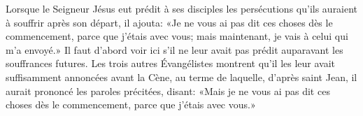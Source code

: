 Lorsque le Seigneur Jésus eut prédit à ses disciples
	les persécutions qu’ils auraient à souffrir après son départ,
	il ajouta: «Je ne vous ai pas dit ces choses dès le commencement,
	parce que j’étais avec vous;
	mais maintenant, je vais à celui qui m’a envoyé.»
Il faut d’abord voir ici
	s’il ne leur avait pas prédit auparavant les souffrances futures.
Les trois autres Évangélistes
	montrent qu’il les leur avait suffisamment annoncées avant la Cène,
	au terme de laquelle, d’après saint Jean,
	il aurait prononcé les paroles précitées, disant:
	«Mais je ne vous ai pas dit ces choses dès le commencement,
	parce que j’étais avec vous.»
